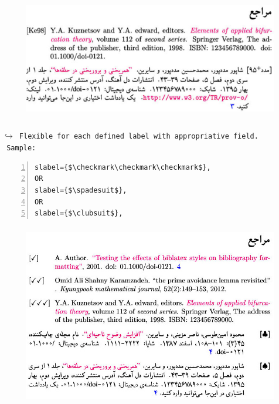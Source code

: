 \documentclass{article}
\begin{document}
\begin{figure}[H]
\centering
\includegraphics[width=\textwidth,height=5.5cm]{image/sh6}
\end{figure}
\begin{latin}
{\tt {\color{red}$\hookrightarrow$ Flexible for each defined label with appropriative field.}}\\
{\tt\color{blue} Sample:}
\end{latin}
\begin{Verbatim}[numbers=left,fontsize=\bf,commandchars=\&\#\*,baselinestretch=1,firstnumber=1,formatcom=\color{green!50!black}]
slabel={$\checkmark\checkmark\checkmark$},
OR
slabel={$\spadesuit$},
OR
slabel={$\clubsuit$},
\end{Verbatim}
\begin{figure}[H]
\centering
\includegraphics[width=\textwidth,height=8cm]{image/sh7}
\end{figure}
\end{document}
